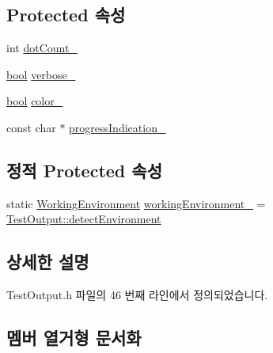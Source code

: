 \subsection*{Protected 속성}
\begin{DoxyCompactItemize}
\item 
int \hyperlink{class_test_output_a3c1c7e8cf0310d384198f0dc504251c6}{dot\+Count\+\_\+}
\item 
\hyperlink{avb__gptp_8h_af6a258d8f3ee5206d682d799316314b1}{bool} \hyperlink{class_test_output_a86126da532c138842a42d8e9a52b0806}{verbose\+\_\+}
\item 
\hyperlink{avb__gptp_8h_af6a258d8f3ee5206d682d799316314b1}{bool} \hyperlink{class_test_output_adda8c1875964c3b80ed1c77b585fc756}{color\+\_\+}
\item 
const char $\ast$ \hyperlink{class_test_output_a4cbc8ea3886624399ab3879767d4f018}{progress\+Indication\+\_\+}
\end{DoxyCompactItemize}
\subsection*{정적 Protected 속성}
\begin{DoxyCompactItemize}
\item 
static \hyperlink{class_test_output_a0541851f863713454486a9fb3080f766}{Working\+Environment} \hyperlink{class_test_output_a8b622cfce4b95599cd31b61a777d68ef}{working\+Environment\+\_\+} = \hyperlink{class_test_output_a0541851f863713454486a9fb3080f766a3f11f791db94db142e33c3c75442ed10}{Test\+Output\+::detect\+Environment}
\end{DoxyCompactItemize}


\subsection{상세한 설명}


Test\+Output.\+h 파일의 46 번째 라인에서 정의되었습니다.



\subsection{멤버 열거형 문서화}
